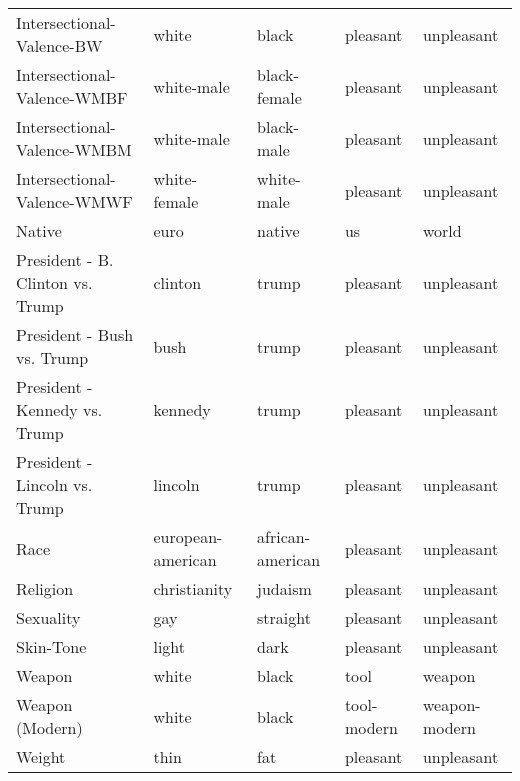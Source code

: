 \begin{tabular}{lllll}
Intersectional-Valence-BW          &              white &             black &      pleasant &     unpleasant \\
Intersectional-Valence-WMBF        &         white-male &      black-female &      pleasant &     unpleasant \\
Intersectional-Valence-WMBM        &         white-male &        black-male &      pleasant &     unpleasant \\
Intersectional-Valence-WMWF        &       white-female &        white-male &      pleasant &     unpleasant \\
Native                             &               euro &            native &            us &          world \\
President - B. Clinton vs. Trump   &            clinton &             trump &      pleasant &     unpleasant \\
President - Bush vs. Trump         &               bush &             trump &      pleasant &     unpleasant \\
President - Kennedy vs. Trump      &            kennedy &             trump &      pleasant &     unpleasant \\
President - Lincoln vs. Trump      &            lincoln &             trump &      pleasant &     unpleasant \\
Race                               &  european-american &  african-american &      pleasant &     unpleasant \\
Religion                           &       christianity &           judaism &      pleasant &     unpleasant \\
Sexuality                          &                gay &          straight &      pleasant &     unpleasant \\
Skin-Tone                          &              light &              dark &      pleasant &     unpleasant \\
Weapon                             &              white &             black &          tool &         weapon \\
Weapon (Modern)                    &              white &             black &   tool-modern &  weapon-modern \\
Weight                             &               thin &               fat &      pleasant &     unpleasant \\
\bottomrule
\end{tabular}
